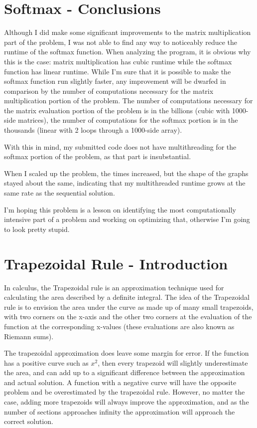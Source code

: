 \documentclass[a4paper]{article}
\begin{document}
\section{Softmax - Conclusions}
Although I did make some significant improvements to the matrix multiplication part of the problem, I was not able to find any way to noticeably reduce the runtime of the softmax function. When analyzing the program, it is obvious why this is the case: matrix multiplication has cubic runtime while the softmax function has linear runtime. While I'm sure that it is possible to make the softmax function run slightly faster, any improvement will be dwarfed in comparison by the number of computations necessary for the matrix multiplication portion of the problem. The number of computations necessary for the matrix evaluation portion of the problem is in the billions (cubic with 1000-side matrices), the number of computations for the softmax portion is in the thousands (linear with 2 loops through a 1000-side array).

With this in mind, my submitted code does not have multithreading for the softmax portion of the problem, as that part is insubstantial.

When I scaled up the problem, the times increased, but the shape of the graphs stayed about the same, indicating that my multithreaded runtime grows at the same rate as the sequential solution.

I'm hoping this problem is a lesson on identifying the most computationally intensive part of a problem and working on optimizing that, otherwise I'm going to look pretty stupid.

\section{Trapezoidal Rule - Introduction}
In calculus, the Trapezoidal rule is an approximation technique used for calculating the area described by a definite integral. The idea of the Trapezoidal rule is to envision the area under the curve as made up of many small trapezoids, with two corners on the x-axis and the other two corners at the evaluation of the function at the corresponding x-values (these evaluations are also known as Riemann sums). 

The trapezoidal approximation does leave some margin for error. If the function has a positive curve such as $x^2$, then every trapezoid will slightly underestimate the area, and can add up to a significant difference between the approximation and actual solution. A function with a negative curve will have the opposite problem and be overestimated by the trapezoidal rule. However, no matter the case, adding more trapezoids will always improve the approximation, and as the number of sections approaches infinity the approximation will approach the correct solution.
\end{document}
